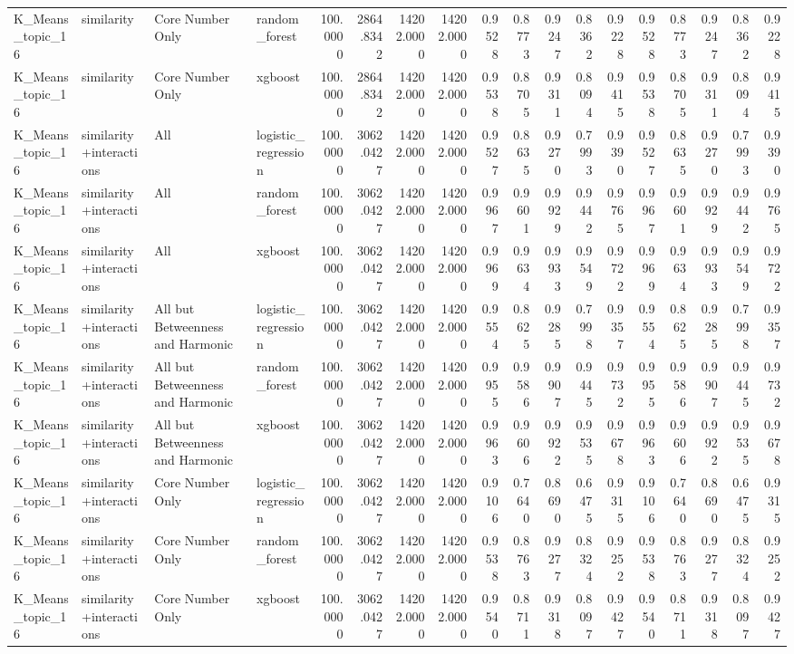 \begin{tabular}{llllrrrrrrrrrrrrrr}
K_Means_topic_16 & similarity & Core Number Only & random_forest & 100.0000 & 2864.8342 & 14202.0000 & 14202.0000 & 0.9528 & 0.8773 & 0.9247 & 0.8362 & 0.9228 & 0.9528 & 0.8773 & 0.9247 & 0.8362 & 0.9228 \\
K_Means_topic_16 & similarity & Core Number Only & xgboost & 100.0000 & 2864.8342 & 14202.0000 & 14202.0000 & 0.9538 & 0.8705 & 0.9311 & 0.8094 & 0.9415 & 0.9538 & 0.8705 & 0.9311 & 0.8094 & 0.9415 \\
K_Means_topic_16 & similarity+interactions & All & logistic_regression & 100.0000 & 3062.0427 & 14202.0000 & 14202.0000 & 0.9527 & 0.8635 & 0.9270 & 0.7993 & 0.9390 & 0.9527 & 0.8635 & 0.9270 & 0.7993 & 0.9390 \\
K_Means_topic_16 & similarity+interactions & All & random_forest & 100.0000 & 3062.0427 & 14202.0000 & 14202.0000 & 0.9967 & 0.9601 & 0.9929 & 0.9442 & 0.9765 & 0.9967 & 0.9601 & 0.9929 & 0.9442 & 0.9765 \\
K_Means_topic_16 & similarity+interactions & All & xgboost & 100.0000 & 3062.0427 & 14202.0000 & 14202.0000 & 0.9969 & 0.9634 & 0.9933 & 0.9549 & 0.9722 & 0.9969 & 0.9634 & 0.9933 & 0.9549 & 0.9722 \\
K_Means_topic_16 & similarity+interactions & All but Betweenness and Harmonic & logistic_regression & 100.0000 & 3062.0427 & 14202.0000 & 14202.0000 & 0.9554 & 0.8625 & 0.9285 & 0.7998 & 0.9357 & 0.9554 & 0.8625 & 0.9285 & 0.7998 & 0.9357 \\
K_Means_topic_16 & similarity+interactions & All but Betweenness and Harmonic & random_forest & 100.0000 & 3062.0427 & 14202.0000 & 14202.0000 & 0.9955 & 0.9586 & 0.9907 & 0.9445 & 0.9732 & 0.9955 & 0.9586 & 0.9907 & 0.9445 & 0.9732 \\
K_Means_topic_16 & similarity+interactions & All but Betweenness and Harmonic & xgboost & 100.0000 & 3062.0427 & 14202.0000 & 14202.0000 & 0.9963 & 0.9606 & 0.9922 & 0.9535 & 0.9678 & 0.9963 & 0.9606 & 0.9922 & 0.9535 & 0.9678 \\
K_Means_topic_16 & similarity+interactions & Core Number Only & logistic_regression & 100.0000 & 3062.0427 & 14202.0000 & 14202.0000 & 0.9106 & 0.7640 & 0.8690 & 0.6475 & 0.9315 & 0.9106 & 0.7640 & 0.8690 & 0.6475 & 0.9315 \\
K_Means_topic_16 & similarity+interactions & Core Number Only & random_forest & 100.0000 & 3062.0427 & 14202.0000 & 14202.0000 & 0.9538 & 0.8763 & 0.9277 & 0.8324 & 0.9252 & 0.9538 & 0.8763 & 0.9277 & 0.8324 & 0.9252 \\
K_Means_topic_16 & similarity+interactions & Core Number Only & xgboost & 100.0000 & 3062.0427 & 14202.0000 & 14202.0000 & 0.9540 & 0.8711 & 0.9318 & 0.8097 & 0.9427 & 0.9540 & 0.8711 & 0.9318 & 0.8097 & 0.9427 \\

\end{tabular}
